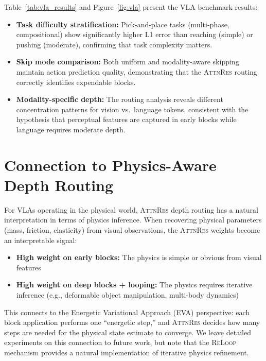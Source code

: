 \documentclass{article}
\newcommand{\attnres}{\textsc{AttnRes}}
\newcommand{\reloop}{\textsc{ReLoop}}
\begin{document}
Table~\ref{tab:vla_results} and Figure~\ref{fig:vla} present the VLA benchmark results:

\begin{itemize}
    \item \textbf{Task difficulty stratification:} Pick-and-place tasks (multi-phase, compositional) show significantly higher L1 error than reaching (simple) or pushing (moderate), confirming that task complexity matters.
    \item \textbf{Skip mode comparison:} Both uniform and modality-aware skipping maintain action prediction quality, demonstrating that the \attnres{} routing correctly identifies expendable blocks.
    \item \textbf{Modality-specific depth:} The routing analysis reveals different concentration patterns for vision vs.\ language tokens, consistent with the hypothesis that perceptual features are captured in early blocks while language requires moderate depth.
\end{itemize}

\section{Connection to Physics-Aware Depth Routing}
\label{sec:physics}

For VLAs operating in the physical world, \attnres{} depth routing has a natural interpretation in terms of physics inference. When recovering physical parameters (mass, friction, elasticity) from visual observations, the \attnres{} weights become an interpretable signal:

\begin{itemize}
    \item \textbf{High weight on early blocks:} The physics is simple or obvious from visual features
    \item \textbf{High weight on deep blocks + looping:} The physics requires iterative inference (e.g., deformable object manipulation, multi-body dynamics)
\end{itemize}

This connects to the Energetic Variational Approach (EVA) perspective: each block application performs one ``energetic step,'' and \attnres{} decides how many steps are needed for the physical state estimate to converge. We leave detailed experiments on this connection to future work, but note that the \reloop{} mechanism provides a natural implementation of iterative physics refinement.
\end{document}
